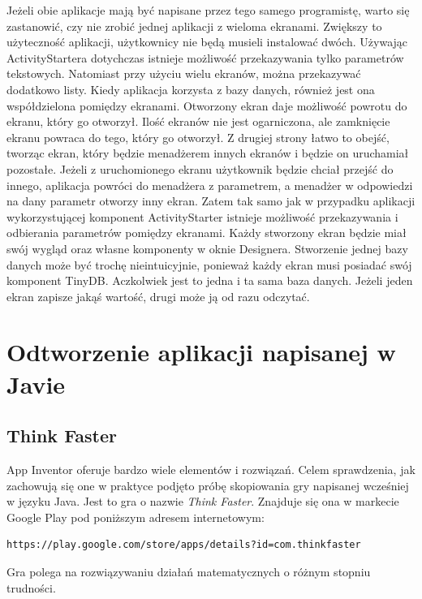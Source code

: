 Jeżeli obie aplikacje mają być napisane przez tego samego programistę, warto się zastanowić, czy nie zrobić jednej aplikacji z wieloma ekranami. Zwiększy to użyteczność aplikacji, użytkownicy nie będą musieli instalować dwóch. Używając ActivityStartera dotychczas istnieje możliwość przekazywania tylko parametrów tekstowych. Natomiast przy użyciu wielu ekranów, można przekazywać dodatkowo listy. Kiedy aplikacja korzysta z bazy danych, również jest ona współdzielona pomiędzy ekranami. Otworzony ekran daje możliwość powrotu do ekranu, który go otworzył. Ilość ekranów nie jest ogarniczona, ale zamknięcie ekranu powraca do tego, który go otworzył. Z drugiej strony łatwo to obejść, tworząc ekran, który będzie menadżerem innych ekranów i będzie on uruchamiał pozostałe. Jeżeli z uruchomionego ekranu użytkownik będzie chciał przejść do innego, aplikacja powróci do menadżera z parametrem, a menadżer w odpowiedzi na dany parametr otworzy inny ekran. Zatem tak samo jak w przypadku aplikacji wykorzystującej komponent ActivityStarter istnieje możliwość przekazywania i odbierania parametrów pomiędzy ekranami. Każdy stworzony ekran będzie miał swój wygląd oraz własne komponenty w oknie Designera. Stworzenie jednej bazy danych może być trochę nieintuicyjnie, ponieważ każdy ekran musi posiadać swój komponent TinyDB. Aczkolwiek jest to jedna i ta sama baza danych. Jeżeli jeden ekran zapisze jakąś wartość, drugi może ją od razu odczytać.

\section{Odtworzenie aplikacji napisanej w Javie}

\subsection{Think Faster}

App Inventor oferuje bardzo wiele elementów i rozwiązań. Celem sprawdzenia, jak zachowują się one w praktyce podjęto próbę skopiowania gry napisanej wcześniej w języku Java. Jest to gra o nazwie \emph{Think Faster}. Znajduje się ona w markecie Google Play pod poniższym adresem internetowym:

\begin{lstlisting}
https://play.google.com/store/apps/details?id=com.thinkfaster
\end{lstlisting} 

Gra polega na rozwiązywaniu działań matematycznych o różnym stopniu trudności. 

